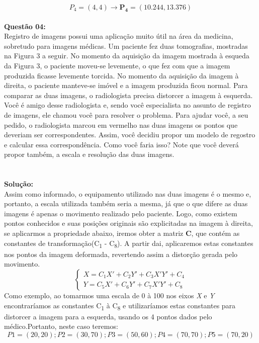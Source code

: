 \[
P_4 = (4, 4) \rightarrow \mathbf{P_4 = (10.244, 13.376)}
\]
\\
\vspace{0.5cm}
\noindent\textbf{Questão 04:}\\
Registro de imagens possui uma aplicação muito útil na área da medicina, sobretudo para imagens médicas. Um paciente fez duas tomografias, mostradas na Figura 3 a seguir. No momento da aquisição da imagem mostrada à esqueda da Figura 3, o paciente moveu-se levemente, o que fez com que a imagem produzida ficasse levemente torcida. No momento da aquisição da imagem à direita, o paciente manteve-se imóvel e a imagem produzida ficou normal. Para comparar as duas imagens, o radiologista precisa distorcer a imagem à esquerda. Você é amigo desse radiologista e, sendo você especialista no assunto de registro de imagens, ele chamou você para resolver o problema. Para ajudar você, a seu pedido, o radiologista marcou em vermelho nas duas imagens os pontos que deveriam ser correspondentes. Assim, você decidiu propor um modelo de regostro e calcular essa correspondência. Como você faria isso? Note que você deverá propor também, a escala e resolução das duas imagens.
\\
\\
\\
\noindent\textbf{Solução:}
\\
Assim como informado, o equipamento utilizado nas duas imagens é o mesmo e, portanto, a escala utilizada também seria a mesma, já que o que difere as duas imagens é apenas o movimento realizado pelo paciente. Logo, como existem pontos conhecidos e suas posições originais são explicitadas na imagem à direita, se aplicarmos a propriedade abaixo, iremos obter a matriz \textbf{C}, que contém as constantes de transformação(C\textsubscript{1} - C\textsubscript{8}). A partir dai, aplicaremos estas constantes nos pontos da imagem deformada, revertendo assim a distorção gerada pelo movimento.
\\
\[
\begin{cases}
X = C_1 X' + C_2 Y' + C_3 X' Y' + C_4 \\
Y = C_5 X' + C_6 Y' + C_7 X' Y' + C_8
\end{cases}
\]
Como exemplo, ao tomarmos uma escala de 0 à 100 nos eixos \emph{X} e \emph{Y} encontraríamos as constantes C\textsubscript{1} à C\textsubscript{8} e utilizaríamos estas constantes para distorcer a imagem para a esquerda, usando os 4 pontos dados pelo médico.Portanto, neste caso teremos:
\[
P1 = (20, 20); P2 = (30, 70);
P3 = (50, 60); P4 = (70, 70);
P5 = (70, 20)
\]
